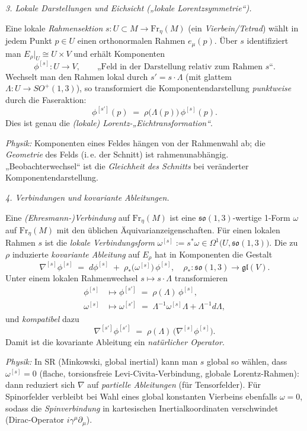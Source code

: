 \documentclass[10pt, letterpaper]{article}
\begin{document}
\bigskip
\emph{3. Lokale Darstellungen und Eichsicht („lokale Lorentzsymmetrie“).}

Eine lokale \emph{Rahmensektion} $s:U\subset M\to\mathrm{Fr}_\eta(M)$ (ein \emph{Vierbein/Tetrad})
wählt in jedem Punkt $p\in U$ einen orthonormalen Rahmen $e_\mu(p)$.
Über $s$ identifiziert man $E_\rho|_U \cong U\times V$ und erhält Komponenten
\[
\phi^{[s]}:U\to V,\qquad \text{„Feld in der Darstellung relativ zum Rahmen }s\text{“}.
\]
Wechselt man den Rahmen lokal durch $s' = s\cdot\Lambda$ (mit glattem $\Lambda:U\to SO^+(1,3)$),
so transformiert die Komponentendarstellung \emph{punktweise} durch die Faseraktion:
\[
\phi^{[s']}(p)\;=\;\rho\bigl(\Lambda(p)\bigr)\,\phi^{[s]}(p).
\]
Dies ist genau die \emph{(lokale) Lorentz-„Eichtransformation“}.

\smallskip
\emph{Physik:} Komponenten eines Feldes hängen von der Rahmenwahl ab; die \emph{Geometrie} des Felds
(i.\,e. der Schnitt) ist rahmenunabhängig. „Beobachterwechsel“ ist die \emph{Gleichheit des Schnitts}
bei veränderter Komponentendarstellung.

\bigskip
\emph{4. Verbindungen und kovariante Ableitungen.}

Eine \emph{(Ehresmann-)Verbindung} auf $\mathrm{Fr}_\eta(M)$ ist eine $ \mathfrak{so}(1,3)$-wertige 1-Form
$\omega$ auf $\mathrm{Fr}_\eta(M)$ mit den üblichen Äquivarianzeigenschaften. Für einen lokalen Rahmen $s$
ist die \emph{lokale Verbindungsform} $\omega^{[s]}:=s^*\omega\in\Omega^1\bigl(U,\mathfrak{so}(1,3)\bigr)$.
Die zu $\rho$ induzierte \emph{kovariante Ableitung} auf $E_\rho$ hat in Komponenten die Gestalt
\[
\nabla^{[s]} \phi^{[s]}\;=\; d\phi^{[s]} \;+\; \rho_*\bigl(\omega^{[s]}\bigr)\,\phi^{[s]},
\quad
\rho_*:\mathfrak{so}(1,3)\to\mathfrak{gl}(V).
\]
Unter einem lokalen Rahmenwechsel $s\mapsto s\cdot\Lambda$ transformieren
\[
\begin{aligned}
\phi^{[s]} &\mapsto \phi^{[s']}\;=\;\rho(\Lambda)\,\phi^{[s]},\\
\omega^{[s]} &\mapsto \omega^{[s']} \;=\; \Lambda^{-1}\omega^{[s]}\Lambda + \Lambda^{-1}d\Lambda,
\end{aligned}
\]
und \emph{kompatibel} dazu
\[
\nabla^{[s']} \phi^{[s']} \;=\; \rho(\Lambda)\,\bigl(\nabla^{[s]} \phi^{[s]}\bigr).
\]
Damit ist die kovariante Ableitung ein \emph{natürlicher Operator}.

\smallskip
\emph{Physik:} In SR (Minkowski, global inertial) kann man $s$ global so wählen, dass
$\omega^{[s]}=0$ (flache, torsionsfreie Levi-Civita-Verbindung, globale Lorentz-Rahmen):
dann reduziert sich $\nabla$ auf \emph{partielle Ableitungen} (für Tensorfelder).
Für Spinorfelder verbleibt bei Wahl eines global konstanten Vierbeins ebenfalls $\omega=0$,
sodass die \emph{Spinverbindung} in kartesischen Inertialkoordinaten verschwindet
(Dirac-Operator $i\gamma^\mu\partial_\mu$).
\end{document}
